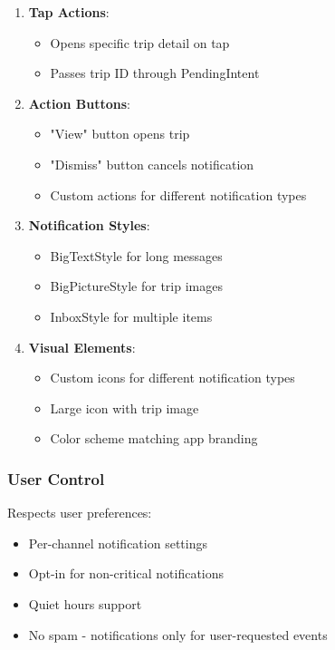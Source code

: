 \documentclass[12pt,a4paper]{article}
\begin{document}
\begin{enumerate}
    \item \textbf{Tap Actions}:
    \begin{itemize}
        \item Opens specific trip detail on tap
        \item Passes trip ID through PendingIntent
    \end{itemize}

    \item \textbf{Action Buttons}:
    \begin{itemize}
        \item "View" button opens trip
        \item "Dismiss" button cancels notification
        \item Custom actions for different notification types
    \end{itemize}

    \item \textbf{Notification Styles}:
    \begin{itemize}
        \item BigTextStyle for long messages
        \item BigPictureStyle for trip images
        \item InboxStyle for multiple items
    \end{itemize}

    \item \textbf{Visual Elements}:
    \begin{itemize}
        \item Custom icons for different notification types
        \item Large icon with trip image
        \item Color scheme matching app branding
    \end{itemize}
\end{enumerate}

\subsubsection{User Control}
Respects user preferences:

\begin{itemize}
    \item Per-channel notification settings
    \item Opt-in for non-critical notifications
    \item Quiet hours support
    \item No spam - notifications only for user-requested events
\end{itemize}
\end{document}
